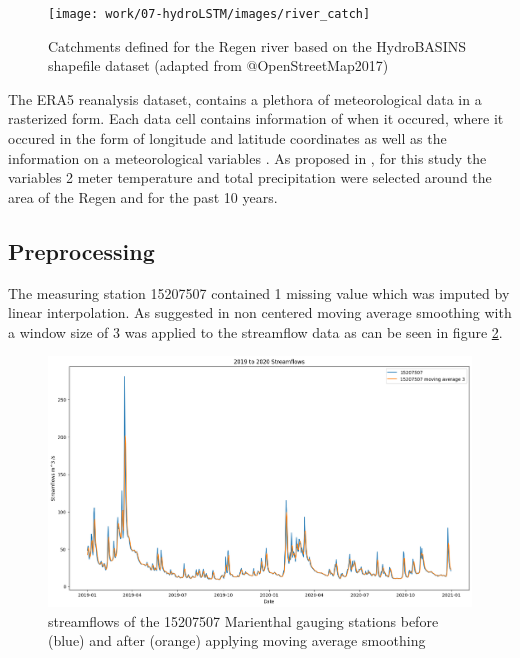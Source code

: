 \documentclass[
]{krantz}
\begin{document}
\begin{figure}

{\centering \texttt{[image: work/07-hydroLSTM/images/river\_catch]} 

}

\caption{Catchments defined for the Regen river based on the HydroBASINS shapefile dataset (adapted from @OpenStreetMap2017)}\label{fig:regen-catch}
\end{figure}

The ERA5 reanalysis dataset, contains a plethora of meteorological data in a rasterized form. Each data cell contains information of when it occured, where it occured in the form of longitude and latitude coordinates as well as the information on a meteorological variables \citet{hersbach2023}. As proposed in \citet{sabzipour2023}, for this study the variables 2 meter temperature and total precipitation were selected around the area of the Regen and for the past 10 years.

\subsection{Preprocessing}\label{preprocessing}

The measuring station 15207507 contained 1 missing value which was imputed by linear interpolation. As suggested in \citet{sabzipour2023} non centered moving average smoothing with a window size of 3 was applied to the streamflow data as can be seen in figure \ref{fig:marien-stream}.

\begin{figure}

{\centering \includegraphics[width=0.8\linewidth]{work/07-hydroLSTM/images/Moving_Average} 

}

\caption{streamflows of the 15207507 Marienthal gauging stations before (blue) and after (orange) applying moving average smoothing}\label{fig:marien-stream}
\end{figure}
\end{document}
